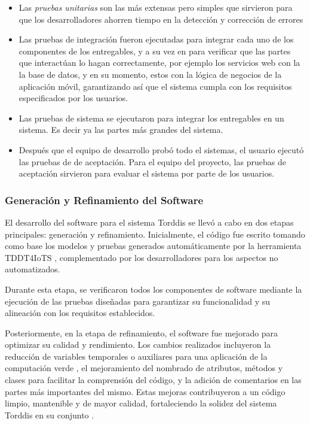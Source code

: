 \begin{itemize}
\item Las \textit{pruebas unitarias} son las más extensas pero simples que sirvieron para que los desarrolladores ahorren tiempo en la detección y corrección de errores \citep{Mafi2024Regression}
\item Las pruebas de integración fueron ejecutadas para integrar cada uno de los componentes de los entregables, y a su vez en para verificar que las partes que interactúan lo hagan correctamente, por ejemplo los servicios web con la la base de datos, y en su momento, estos con la lógica de negocios de la aplicación móvil, garantizando así que el sistema cumpla con los requisitos especificados por los usuarios.
\item Las pruebas de sistema se ejecutaron para integrar los entregables en un sistema. Es decir ya las partes más grandes del sistema.
\item Después que el equipo de desarrollo probó todo el sistemas, el usuario ejecutó las pruebas de de aceptación. Para el equipo del proyecto, las pruebas de aceptación sirvieron para evaluar el sistema por parte de los usuarios.
\end{itemize}

\subsubsection{Generación y Refinamiento del Software} 
El desarrollo del software para el sistema Torddis se llevó a cabo en dos etapas principales: generación y refinamiento. Inicialmente, el código fue escrito tomando como base los modelos y pruebas generados automáticamente por la herramienta TDDT4IoTS \citep{Guerrero2024Test}, complementado por los desarrolladores para los aspectos no automatizados. 

Durante esta etapa, se verificaron todos los componentes de software mediante la ejecución de las pruebas diseñadas para garantizar su funcionalidad y su alineación con los requisitos establecidos.

Posteriormente, en la etapa de refinamiento, el software fue mejorado para optimizar su calidad y rendimiento. Los cambios realizados incluyeron la reducción de variables temporales o auxiliares para una aplicación de la computación verde \citep{Firmansyah2024Integrating}, el mejoramiento del nombrado de atributos, métodos y clases para facilitar la comprensión del código, y la adición de comentarios en las partes más importantes del mismo. Estas mejoras contribuyeron a un código limpio, mantenible y de mayor calidad, fortaleciendo la solidez del sistema Torddis en su conjunto \citep{Marabesi2024Exploring}.

